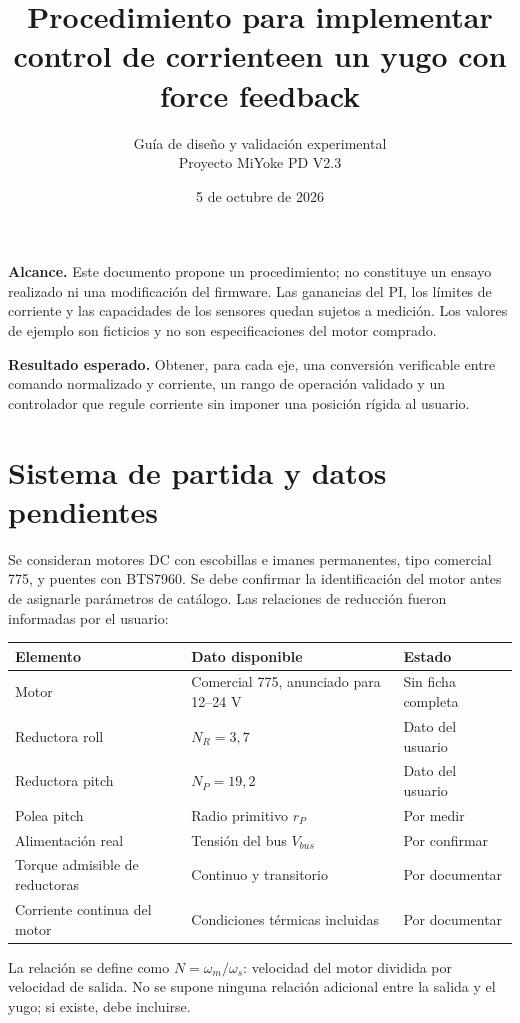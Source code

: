 \documentclass[11pt,a4paper]{article}
\title{Procedimiento para implementar control de corriente\newline en un yugo con force feedback}
\author{Guía de diseño y validación experimental\\Proyecto MiYoke PD V2.3}
\date{5 de octubre de 2026}
\begin{document}
\maketitle

\begin{center}
\end{center}

\textbf{Alcance.} Este documento propone un procedimiento; no constituye un ensayo realizado ni una modificación del firmware. Las ganancias del PI, los límites de corriente y las capacidades de los sensores quedan sujetos a medición. Los valores de ejemplo son ficticios y no son especificaciones del motor comprado.

\textbf{Resultado esperado.} Obtener, para cada eje, una conversión verificable entre comando normalizado y corriente, un rango de operación validado y un controlador que regule corriente sin imponer una posición rígida al usuario.

\tableofcontents
\newpage

\section{Sistema de partida y datos pendientes}
Se consideran motores DC con escobillas e imanes permanentes, tipo comercial 775, y puentes con BTS7960. Se debe confirmar la identificación del motor antes de asignarle parámetros de catálogo. Las relaciones de reducción fueron informadas por el usuario:
\begin{center}
\begin{tabularx}{\textwidth}{lXl}
\toprule
Elemento & Dato disponible & Estado\\
\midrule
Motor & Comercial 775, anunciado para 12--24 V & Sin ficha completa\\
Reductora roll & $N_R=3{,}7$ & Dato del usuario\\
Reductora pitch & $N_P=19{,}2$ & Dato del usuario\\
Polea pitch & Radio primitivo $r_P$ & Por medir\\
Alimentación real & Tensión del bus $V_{bus}$ & Por confirmar\\
Torque admisible de reductoras & Continuo y transitorio & Por documentar\\
Corriente continua del motor & Condiciones térmicas incluidas & Por documentar\\
\bottomrule
\end{tabularx}
\end{center}
La relación se define como $N=\omega_m/\omega_s$: velocidad del motor dividida por velocidad de salida. No se supone ninguna relación adicional entre la salida y el yugo; si existe, debe incluirse.
\end{document}
